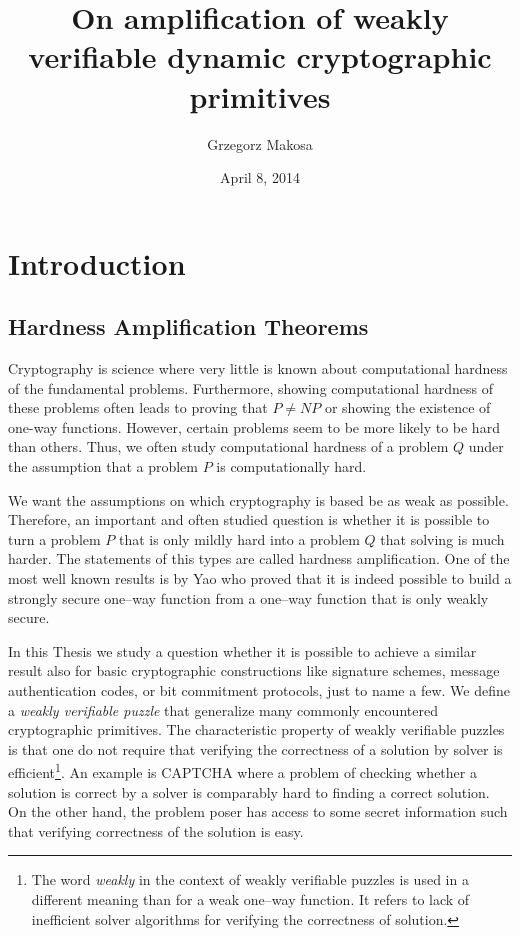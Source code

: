 \documentclass[11pt,a4paper,titlepage]{memoir}
\title{On amplification of weakly verifiable dynamic cryptographic primitives}
\author{Grzegorz Makosa}
\date{April 8, 2014}
\begin{document}
\frontmatter

%

\cleartorecto
\tableofcontents
\mainmatter

\chapter{Introduction}
\section{Hardness Amplification Theorems}
Cryptography is science where very little is known about computational hardness of the fundamental problems.
Furthermore, showing computational hardness of these problems often leads to proving that $P \neq NP$ or showing the existence of one-way functions.
However, certain problems seem to be more likely to be hard than others.
Thus, we often study computational hardness of a problem $Q$ under the assumption that a problem $P$ is computationally hard.

We want the assumptions on which cryptography is based be as weak as possible.
Therefore, an important and often studied question is whether it is possible to turn a problem $P$
that is only mildly hard into a problem $Q$ that solving is much harder.
The statements of this types are called hardness amplification. One of the most well known
results is by Yao who proved that it is indeed possible to build a strongly secure one--way function
from a one--way function that is only weakly secure.

In this Thesis we study a question whether it is possible to achieve a similar result also for basic cryptographic constructions
like signature schemes, message authentication codes, or bit commitment protocols, just to name a few.
We define a \textit{weakly verifiable puzzle} that generalize many commonly encountered cryptographic primitives.
The characteristic property of weakly verifiable puzzles is that one do not require that verifying the correctness of a solution by solver is efficient\footnote{
The word \textit{weakly} in the context of weakly verifiable puzzles is used in a different meaning than for a weak one--way function.
It refers to lack of inefficient solver algorithms for verifying the correctness of solution.}.
An example is CAPTCHA where a problem of checking whether a solution is correct by a solver is comparably hard to finding a correct solution.
On the other hand, the problem poser has access to some secret information such that verifying correctness of the solution is easy.
\end{document}
